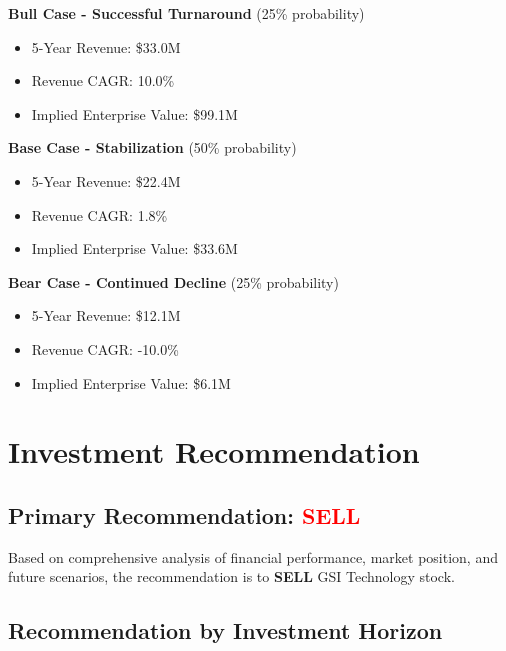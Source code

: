 \documentclass[11pt,a4paper]{article}
\begin{document}
\textbf{Bull Case - Successful Turnaround} (25\% probability)

\begin{itemize}
\itemsep0.2em
\item 5-Year Revenue: \$33.0M
\item Revenue CAGR: 10.0\%
\item Implied Enterprise Value: \$99.1M
\end{itemize}

\vspace{0.2cm}

\textbf{Base Case - Stabilization} (50\% probability)

\begin{itemize}
\itemsep0.2em
\item 5-Year Revenue: \$22.4M
\item Revenue CAGR: 1.8\%
\item Implied Enterprise Value: \$33.6M
\end{itemize}

\vspace{0.2cm}

\textbf{Bear Case - Continued Decline} (25\% probability)

\begin{itemize}
\itemsep0.2em
\item 5-Year Revenue: \$12.1M
\item Revenue CAGR: -10.0\%
\item Implied Enterprise Value: \$6.1M
\end{itemize}

\vspace{0.2cm}


\newpage

\section{Investment Recommendation}

\subsection{Primary Recommendation: \textcolor{red}{SELL}}

Based on comprehensive analysis of financial performance, market position, and future scenarios, the recommendation is to \textbf{SELL} GSI Technology stock.

\vspace{0.3cm}

\subsection{Recommendation by Investment Horizon}
\end{document}
